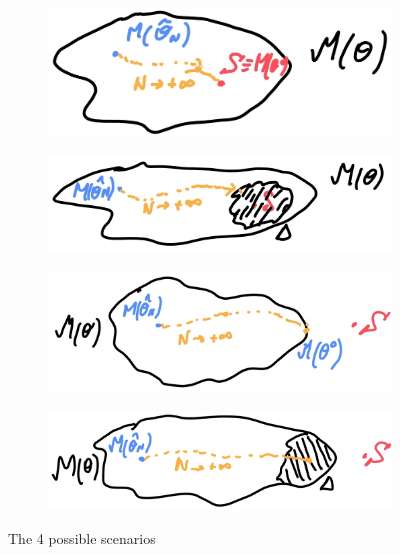 \begin{figure}[h]
\centering

\begin{subfigure}{0.23\textwidth}
  \centering
  \includegraphics[width=\linewidth]{images/s1.jpg}
  \caption{}
\end{subfigure}
\hfill
\begin{subfigure}{0.23\textwidth}
  \centering
  \includegraphics[width=\linewidth]{images/s2.jpg}
  \caption{}
\end{subfigure}
\hfill
\begin{subfigure}{0.23\textwidth}
  \centering
  \includegraphics[width=\linewidth]{images/s3.jpg}
  \caption{}
\end{subfigure}
\hfill
\begin{subfigure}{0.23\textwidth}
  \centering
  \includegraphics[width=\linewidth]{images/s4.jpg}
  \caption{}
\end{subfigure}

\caption{The 4 possible scenarios}
\label{fig:quattro_immagini}
\end{figure}

